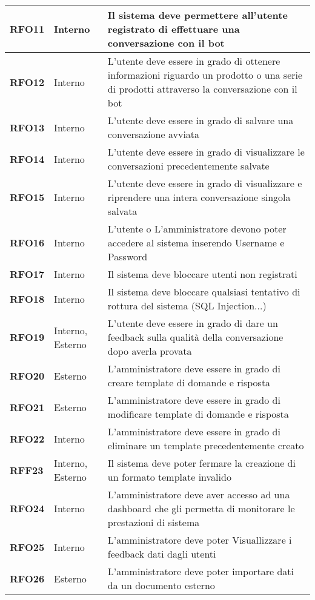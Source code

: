 \begin{longtable}{|>{\centering\arraybackslash}m{}|>{\centering\arraybackslash}m{}|>{\arraybackslash}m{}|}
	\hline
	\textbf{RFO11} & Interno & Il sistema deve permettere all'utente registrato di effettuare una conversazione con il bot\\
	\hline
	\textbf{RFO12} & Interno & L'utente deve essere in grado di ottenere informazioni riguardo un prodotto o una serie di prodotti attraverso la conversazione con il bot\\
	\hline
	\textbf{RFO13} & Interno & L'utente deve essere in grado di salvare una conversazione avviata\\
	\hline
	\textbf{RFO14} & Interno & L'utente deve essere in grado di visualizzare le conversazioni precedentemente salvate\\
	\hline
	\textbf{RFO15} & Interno & L'utente deve essere in grado di visualizzare e riprendere una intera conversazione singola salvata\\
	\hline
	\textbf{RFO16} & Interno & L'utente o L'amministratore devono poter accedere al sistema inserendo Username e Password\\
	\hline
	\textbf{RFO17} & Interno & Il sistema deve bloccare utenti non registrati\\
	\hline
	\textbf{RFO18} & Interno & Il sistema deve bloccare qualsiasi tentativo di rottura del sistema (SQL Injection...)\\
	\hline
	\textbf{RFO19} & Interno, Esterno & L'utente deve essere in grado di dare un feedback sulla qualità della conversazione dopo averla provata\\
	\hline
	\textbf{RFO20} & Esterno & L'amministratore deve essere in grado di creare template di domande e risposta\\
	\hline
	\textbf{RFO21} & Esterno & L'amministratore deve essere in grado di modificare template di domande e risposta\\
	\hline
	\textbf{RFO22} & Interno & L'amministratore deve essere in grado di eliminare un template precedentemente creato\\
	\hline
	\textbf{RFF23} & Interno, Esterno & Il sistema deve poter fermare la creazione di un formato template invalido\\
	\hline
	\textbf{RFO24} & Interno & L'amministratore deve aver accesso ad una dashboard che gli permetta di monitorare le prestazioni di sistema\\
	\hline
	\textbf{RFO25} & Interno & L'amministratore deve poter Visuallizzare i feedback dati dagli utenti\\
	\hline
	\textbf{RFO26} & Esterno & L'amministratore deve poter importare dati da un documento esterno\\

\end{longtable}

